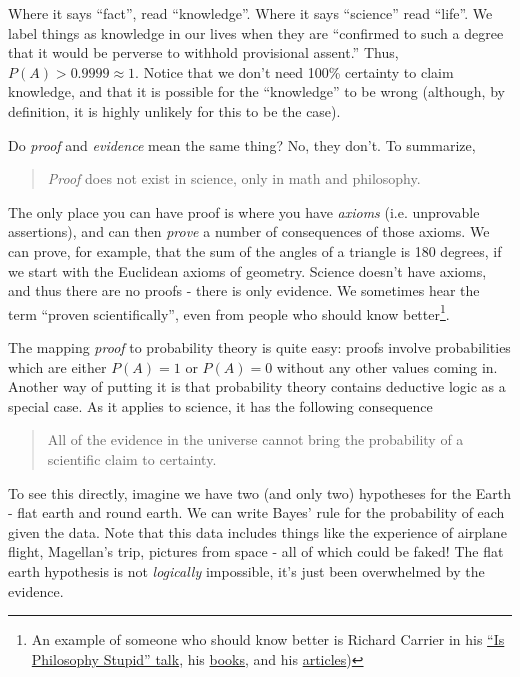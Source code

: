 Where it says ``fact'', read ``knowledge''.  Where it says ``science''
read ``life''.  We label things as knowledge in our lives when they are
``confirmed to such a degree that it would be perverse to withhold
provisional assent.''  Thus, $P(A)>0.9999 \approx 1$.  Notice that we don't need 100\% certainty to claim knowledge, and that it is possible for the ``knowledge'' to be wrong (although, by definition, it is highly unlikely for this to be the case).  

Do {\em proof} and {\em evidence} mean the same thing?  No, they don't. To summarize,

\begin{quote}
\emph{Proof} does not exist in science, only in math and philosophy.
\end{quote}

The only place you can have proof is where you have \emph{axioms}
(i.e. unprovable assertions), and can then \emph{prove} a number of
consequences of those axioms. We can prove, for example, that the sum of
the angles of a triangle is 180 degrees, if we start with the Euclidean
axioms of geometry. Science doesn't have axioms, and thus there are no
proofs - there is only evidence. We sometimes hear the term ``proven
scientifically'', even from people who should know better\footnote{An example of someone who should know better is Richard
Carrier in his \href{http://www.youtube.com/watch?v=YLvWz9GQ3PQ}{``Is
Philosophy Stupid'' talk}, his
\href{http://www.amazon.com/Proving-History-Bayess-Theorem-Historical/dp/1616145595}{books},
and his
\href{http://infidels.org/library/modern/richard_carrier/theory.html}{articles})}.

The mapping {\em proof} to probability theory is quite easy: proofs involve probabilities which are either $P(A)=1$ or $P(A)=0$ without any other values coming in.  Another way of putting it is that probability theory contains deductive logic as a special case.  As it applies to science, it has the following consequence

\begin{quote}
All of the evidence in the universe cannot bring the probability of a
scientific claim to certainty.
\end{quote}

To see this directly, imagine we have two (and only two) hypotheses for
the Earth - flat earth and round earth. We can write Bayes' rule for the
probability of each given the data. Note that this data includes things
like the experience of airplane flight, Magellan's trip, pictures from
space - all of which could be faked! The flat earth hypothesis is not
\emph{logically} impossible, it's just been overwhelmed by the evidence.

